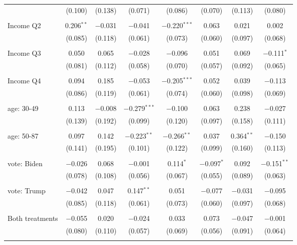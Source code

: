 \begin{tabular}{@{\extracolsep{5pt}}lccccccc}
  & (0.100) & (0.138) & (0.071) & (0.086) & (0.070) & (0.113) & (0.080) \\ 
  & & & & & & & \\ 
 Income Q2 & 0.206$^{**}$ & $-$0.031 & $-$0.041 & $-$0.220$^{***}$ & 0.063 & 0.021 & 0.002 \\ 
  & (0.085) & (0.118) & (0.061) & (0.073) & (0.060) & (0.097) & (0.068) \\ 
  & & & & & & & \\ 
 Income Q3 & 0.050 & 0.065 & $-$0.028 & $-$0.096 & 0.051 & 0.069 & $-$0.111$^{*}$ \\ 
  & (0.081) & (0.112) & (0.058) & (0.070) & (0.057) & (0.092) & (0.065) \\ 
  & & & & & & & \\ 
 Income Q4 & 0.094 & 0.185 & $-$0.053 & $-$0.205$^{***}$ & 0.052 & 0.039 & $-$0.113 \\ 
  & (0.086) & (0.119) & (0.061) & (0.074) & (0.060) & (0.098) & (0.069) \\ 
  & & & & & & & \\ 
 age: 30-49 & 0.113 & $-$0.008 & $-$0.279$^{***}$ & $-$0.100 & 0.063 & 0.238 & $-$0.027 \\ 
  & (0.139) & (0.192) & (0.099) & (0.120) & (0.097) & (0.158) & (0.111) \\ 
  & & & & & & & \\ 
 age: 50-87 & 0.097 & 0.142 & $-$0.223$^{**}$ & $-$0.266$^{**}$ & 0.037 & 0.364$^{**}$ & $-$0.150 \\ 
  & (0.141) & (0.195) & (0.101) & (0.122) & (0.099) & (0.160) & (0.113) \\ 
  & & & & & & & \\ 
 vote: Biden & $-$0.026 & 0.068 & $-$0.001 & 0.114$^{*}$ & $-$0.097$^{*}$ & 0.092 & $-$0.151$^{**}$ \\ 
  & (0.078) & (0.108) & (0.056) & (0.067) & (0.055) & (0.089) & (0.063) \\ 
  & & & & & & & \\ 
 vote: Trump & $-$0.042 & 0.047 & 0.147$^{**}$ & 0.051 & $-$0.077 & $-$0.031 & $-$0.095 \\ 
  & (0.085) & (0.118) & (0.061) & (0.073) & (0.060) & (0.097) & (0.068) \\ 
  & & & & & & & \\ 
 Both treatments & $-$0.055 & 0.020 & $-$0.024 & 0.033 & 0.073 & $-$0.047 & $-$0.001 \\ 
  & (0.080) & (0.110) & (0.057) & (0.069) & (0.056) & (0.091) & (0.064) \\ 
  & & & & & & & \\ 

\end{tabular}
